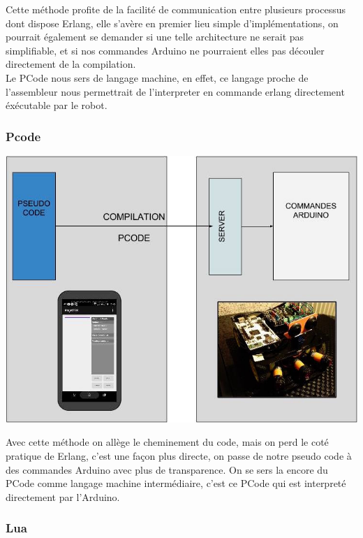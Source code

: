 \documentclass[a4paper]{article}
\begin{document}
Cette méthode profite de la facilité de communication entre plusieurs processus dont dispose Erlang, elle s’avère en premier lieu simple d’implémentations, on pourrait également se demander si une telle architecture ne serait pas simplifiable, et si nos commandes Arduino ne pourraient elles pas découler directement de la compilation.\\
Le PCode nous sers de langage machine, en effet, ce langage proche de l'assembleur nous permettrait de l'interpreter en commande erlang directement éxécutable par le robot.

\vfill\eject
\subsubsection{Pcode}

\begin{center}
\includegraphics[scale=0.5]{img/archi-pcode.jpg}
\end{center}

Avec cette méthode on allège le cheminement du code, mais on perd le coté pratique de Erlang, c’est une façon plus directe, on passe de notre pseudo code à des commandes Arduino avec plus de transparence. On se sers la encore du PCode comme langage machine intermédiaire, c'est ce PCode qui est interpreté directement par l'Arduino.

\vfill\eject
\subsubsection{Lua}
\end{document}
